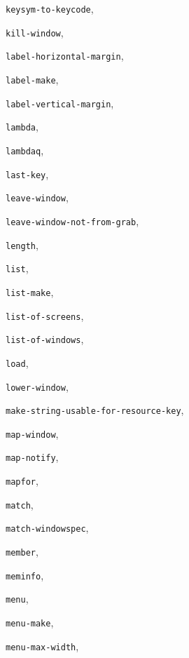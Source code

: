 \begin{theindex}
\item {\tt keysym-to-keycode}, {\bf\pageref{keysym-to-keycode}}
\item {\tt kill-window}, {\bf\pageref{kill-window}}
\item {\tt label-horizontal-margin}, {\bf\pageref{label-horizontal-margin}}
\item {\tt label-make}, {\bf\pageref{label-make}}
\item {\tt label-vertical-margin}, {\bf\pageref{label-vertical-margin}}
\item {\tt lambda}, {\bf\pageref{lambda}}
\item {\tt lambdaq}, {\bf\pageref{lambdaq}}
\item {\tt last-key}, {\bf\pageref{last-key}}
\item {\tt leave-window}, {\bf\pageref{leave-window}}
\item {\tt leave-window-not-from-grab}, {\bf\pageref{leave-window-not-from-grab}}
\item {\tt length}, {\bf\pageref{length}}
\item {\tt list}, {\bf\pageref{list}}
\item {\tt list-make}, {\bf\pageref{list-make}}
\item {\tt list-of-screens}, {\bf\pageref{list-of-screens}}
\item {\tt list-of-windows}, {\bf\pageref{list-of-windows}}
\item {\tt load}, {\bf\pageref{load}}
\item {\tt lower-window}, {\bf\pageref{lower-window}}
\item {\tt make-string-usable-for-resource-key}, {\bf\pageref{make-string-usable-for-resource-key}}
\item {\tt map-window}, {\bf\pageref{map-window}}
\item {\tt map-notify}, {\bf\pageref{map-notify}}
\item {\tt mapfor}, {\bf\pageref{mapfor}}
\item {\tt match}, {\bf\pageref{match}}
\item {\tt match-windowspec}, {\bf\pageref{match-windowspec}}
\item {\tt member}, {\bf\pageref{member}}
\item {\tt meminfo}, {\bf\pageref{meminfo}}
\item {\tt menu}, {\bf\pageref{menu}}
\item {\tt menu-make}, {\bf\pageref{menu-make}}
\item {\tt menu-max-width}, {\bf\pageref{menu-max-width}}

\end{theindex}
